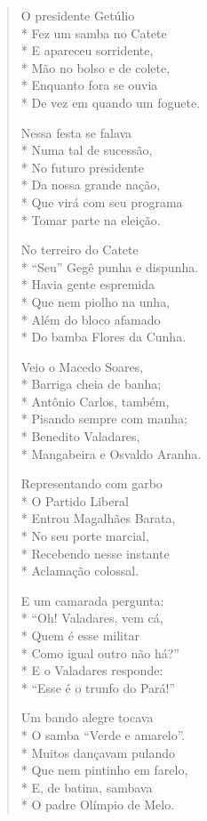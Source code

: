 \begin{verse}
O presidente Getúlio\\*
Fez um samba no Catete\\*
E apareceu sorridente,\\*
Mão no bolso e de colete,\\*
Enquanto fora se ouvia\\*
De vez em quando um foguete.

Nessa festa se falava\\*
Numa tal de sucessão,\\*
No futuro presidente\\*
Da nossa grande nação,\\*
Que virá com seu programa\\*
Tomar parte na eleição.

No terreiro do Catete\\*
“Seu” Gegê punha e dispunha.\\*
Havia gente espremida\\*
Que nem piolho na unha,\\*
Além do bloco afamado\\*
Do bamba Flores da Cunha.

Veio o Macedo Soares,\\*
Barriga cheia de banha;\\*
Antônio Carlos, também,\\*
Pisando sempre com manha;\\*
Benedito Valadares,\\*
Mangabeira e Osvaldo Aranha.

Representando com garbo\\*
O Partido Liberal\\*
Entrou Magalhães Barata,\\*
No seu porte marcial,\\*
Recebendo nesse instante\\*
Aclamação colossal.

E um camarada pergunta:\\*
“Oh! Valadares, vem cá,\\*
Quem é esse militar\\*
Como igual outro não há?”\\*
E o Valadares responde:\\*
“Esse é o trunfo do Pará!”

Um bando alegre tocava\\*
O samba “Verde e amarelo”.\\*
Muitos dançavam pulando\\*
Que nem pintinho em farelo,\\*
E, de batina, sambava\\*
O padre Olímpio de Melo.


\end{verse}

